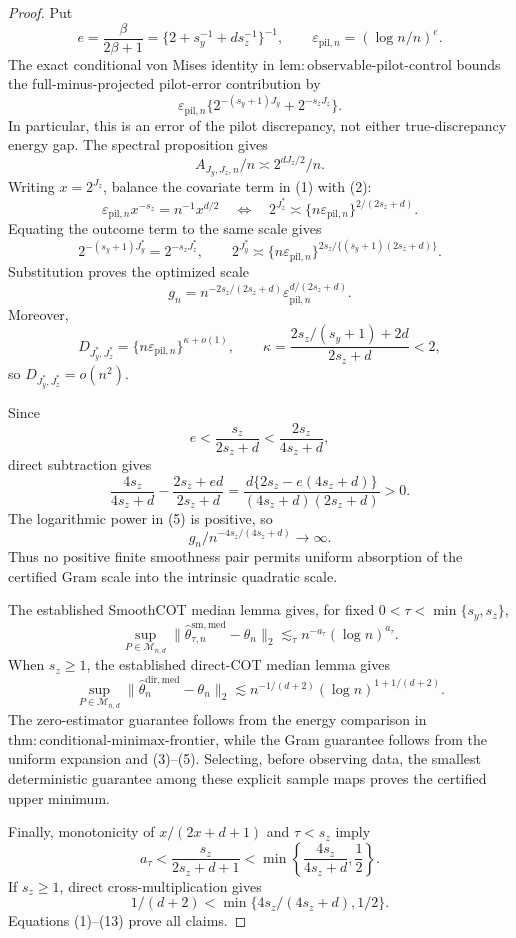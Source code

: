 \documentclass{article}
\begin{document}
\begin{proof}
Put
\[
e=\frac{\beta}{2\beta+1}=\{2+s_y^{-1}+ds_z^{-1}\}^{-1},
\qquad \varepsilon_{\mathrm{pil},n}=(\log n/n)^e.
\]
The exact conditional von Mises identity in \(\mathrm{lem{:}observable\text{-}pilot\text{-}control}\) bounds the full-minus-projected pilot-error contribution by
\[
\varepsilon_{\mathrm{pil},n}
\{2^{-(s_y+1)J_y}+2^{-s_zJ_z}\}. \tag{1}
\]
In particular, this is an error of the pilot discrepancy, not either true-discrepancy energy gap.  The spectral proposition gives
\[
A_{J_y,J_z,n}/n\asymp2^{dJ_z/2}/n. \tag{2}
\]
Writing \(x=2^{J_z}\), balance the covariate term in (1) with (2):
\[
\varepsilon_{\mathrm{pil},n}x^{-s_z}=n^{-1}x^{d/2}
\quad\Longleftrightarrow\quad
2^{J_z^*}\asymp\{n\varepsilon_{\mathrm{pil},n}\}^{2/(2s_z+d)}. \tag{3}
\]
Equating the outcome term to the same scale gives
\[
2^{-(s_y+1)J_y^*}=2^{-s_zJ_z^*},
\qquad
2^{J_y^*}\asymp
\{n\varepsilon_{\mathrm{pil},n}\}^{2s_z/\{(s_y+1)(2s_z+d)\}}. \tag{4}
\]
Substitution proves the optimized scale
\[
g_n=n^{-2s_z/(2s_z+d)}
\varepsilon_{\mathrm{pil},n}^{d/(2s_z+d)}. \tag{5}
\]
Moreover,
\[
D_{J_y^*,J_z^*}
=\{n\varepsilon_{\mathrm{pil},n}\}^{\kappa+o(1)},
\qquad
\kappa=\frac{2s_z/(s_y+1)+2d}{2s_z+d}<2, \tag{6}
\]
so \(D_{J_y^*,J_z^*}=o(n^2)\).

Since
\[
e<\frac{s_z}{2s_z+d}<\frac{2s_z}{4s_z+d}, \tag{7}
\]
direct subtraction gives
\[
\frac{4s_z}{4s_z+d}-\frac{2s_z+ed}{2s_z+d}
=\frac{d\{2s_z-e(4s_z+d)\}}{(4s_z+d)(2s_z+d)}>0. \tag{8}
\]
The logarithmic power in (5) is positive, so
\[
g_n/n^{-4s_z/(4s_z+d)}\to\infty. \tag{9}
\]
Thus no positive finite smoothness pair permits uniform absorption of the certified Gram scale into the intrinsic quadratic scale.

The established SmoothCOT median lemma gives, for fixed \(0<\tau<\min\{s_y,s_z\}\),
\[
\sup_{P\in\mathcal M_{n,d}}
\|\widehat\theta^{\mathrm{sm,med}}_{\tau,n}-\theta_n\|_2
\lesssim_\tau n^{-a_\tau}(\log n)^{a_\tau}. \tag{10}
\]
When \(s_z\ge1\), the established direct-COT median lemma gives
\[
\sup_{P\in\mathcal M_{n,d}}
\|\widehat\theta_n^{\mathrm{dir,med}}-\theta_n\|_2
\lesssim n^{-1/(d+2)}(\log n)^{1+1/(d+2)}. \tag{11}
\]
The zero-estimator guarantee follows from the energy comparison in \(\mathrm{thm{:}conditional\text{-}minimax\text{-}frontier}\), while the Gram guarantee follows from the uniform expansion and (3)--(5).  Selecting, before observing data, the smallest deterministic guarantee among these explicit sample maps proves the certified upper minimum.

Finally, monotonicity of \(x/(2x+d+1)\) and \(\tau<s_z\) imply
\[
a_\tau<\frac{s_z}{2s_z+d+1}<
\min\left\{\frac{4s_z}{4s_z+d},\frac12\right\}. \tag{12}
\]
If \(s_z\ge1\), direct cross-multiplication gives
\[
1/(d+2)<\min\{4s_z/(4s_z+d),1/2\}. \tag{13}
\]
Equations (1)--(13) prove all claims.
\end{proof}
\end{document}
